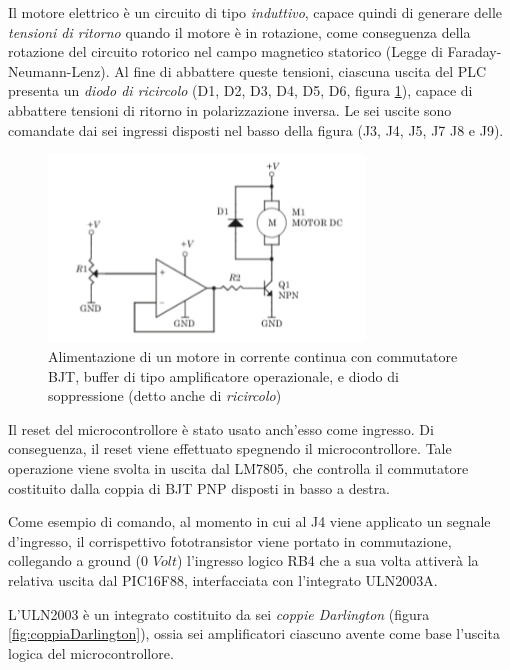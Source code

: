 \documentclass[17pt]{extarticle}
\begin{document}
Il motore elettrico è un circuito di tipo \emph{induttivo}, capace quindi di generare delle \emph{tensioni di ritorno} quando il motore è in rotazione, come conseguenza della rotazione del circuito rotorico nel campo magnetico statorico (Legge di Faraday-Neumann-Lenz). Al fine di abbattere queste tensioni, ciascuna uscita del PLC presenta un \emph{diodo di ricircolo} (D1, D2, D3, D4, D5, D6, figura \ref{fig:motoreDC_diodoSoppressore}), capace di abbattere tensioni di ritorno in polarizzazione inversa. Le sei uscite sono comandate dai sei ingressi disposti nel basso della figura (J3, J4, J5, J7 J8 e J9). 

\begin{figure}[b!]		
	\centering
   	\includegraphics[width=3.3in]{motoreDC_diodoSoppressore.png}%
  	\caption{Alimentazione di un motore in corrente continua con commutatore BJT, buffer di tipo amplificatore operazionale, e diodo di soppressione (detto anche di \emph{ricircolo}) }
   	\label{fig:motoreDC_diodoSoppressore}
\end{figure}

Il reset del microcontrollore è stato usato anch'esso come ingresso. Di conseguenza, il reset viene effettuato spegnendo il microcontrollore. Tale operazione viene svolta in uscita dal LM7805, che controlla il commutatore costituito dalla coppia di BJT PNP disposti in basso a destra.




Come esempio di comando, al momento in cui al J4 viene applicato un segnale d'ingresso, il corrispettivo fototransistor viene portato in commutazione, collegando a ground ($0$ $Volt$) l'ingresso logico RB4 che a sua volta attiverà la relativa uscita dal PIC16F88, interfacciata con l'integrato ULN2003A.



L'ULN2003 è un integrato costituito da sei \emph{coppie Darlington} (figura \ref{fig:coppiaDarlington}), ossia sei amplificatori ciascuno avente come base l'uscita logica del microcontrollore. %
\end{document}
